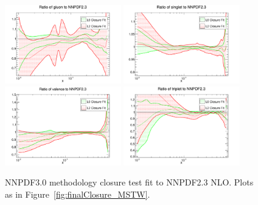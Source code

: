 \begin{figure}[!]
\centering
\includegraphics[width=0.45\textwidth]{7-PostLHC/figs/finalClosure/NNPDF23/gluon.pdf}
\includegraphics[width=0.45\textwidth]{7-PostLHC/figs/finalClosure/NNPDF23/singlet.pdf}
\includegraphics[width=0.45\textwidth]{7-PostLHC/figs/finalClosure/NNPDF23/valence.pdf}
\includegraphics[width=0.45\textwidth]{7-PostLHC/figs/finalClosure/NNPDF23/triplet.pdf}
\caption[NNPDF3.0 methodology closure test fit to NNPDF2.3 NLO]{NNPDF3.0 methodology closure test fit to NNPDF2.3 NLO. Plots as in Figure~\ref{fig:finalClosure_MSTW}. }
\label{fig:finalClosure_NNPDF}
\end{figure}
